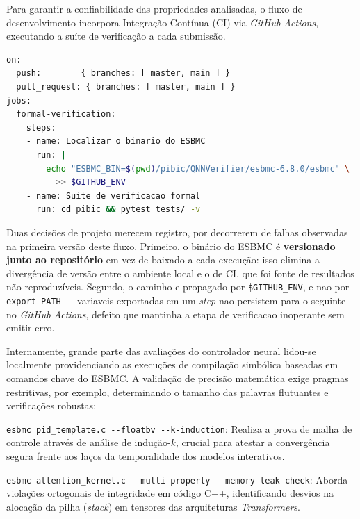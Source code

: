 Para garantir a confiabilidade das propriedades analisadas, o fluxo de desenvolvimento incorpora Integração Contínua (CI) via \textit{GitHub Actions}, executando a suíte de verificação a cada submissão.

\begin{lstlisting}[language=bash, numbers=none]
on:
  push:        { branches: [ master, main ] }
  pull_request: { branches: [ master, main ] }
jobs:
  formal-verification:
    steps:
    - name: Localizar o binario do ESBMC
      run: |
        echo "ESBMC_BIN=$(pwd)/pibic/QNNVerifier/esbmc-6.8.0/esbmc" \
          >> $GITHUB_ENV
    - name: Suite de verificacao formal
      run: cd pibic && pytest tests/ -v
\end{lstlisting}

Duas decisões de projeto merecem registro, por decorrerem de falhas observadas na primeira versão deste fluxo. Primeiro, o binário do ESBMC é \textbf{versionado junto ao repositório} em vez de baixado a cada execução: isso elimina a divergência de versão entre o ambiente local e o de CI, que foi fonte de resultados não reproduzíveis. Segundo, o caminho e propagado por \texttt{\$GITHUB\_ENV}, e nao por \texttt{export PATH} --- variaveis exportadas em um \textit{step} nao persistem para o seguinte no \textit{GitHub Actions}, defeito que mantinha a etapa de verificacao inoperante sem emitir erro.

Internamente, grande parte das avaliações do controlador neural lidou-se localmente providenciando as execuções de compilação simbólica baseadas em comandos chave do ESBMC. A validação de precisão matemática exige pragmas restritivas, por exemplo, determinando o tamanho das palavras flutuantes e verificações robustas:
\begin{alineas}
    \item \texttt{esbmc pid\_template.c -{}-floatbv -{}-k-induction}: Realiza a prova de malha de controle através de análise de indução-$k$, crucial para atestar a convergência segura frente aos laços da temporalidade dos modelos interativos.
    \item \texttt{esbmc attention\_kernel.c -{}-multi-property -{}-memory-leak-check}: Aborda violações ortogonais de integridade em código C++, identificando desvios na alocação da pilha (\textit{stack}) em tensores das arquiteturas \textit{Transformers}.
\end{alineas}
